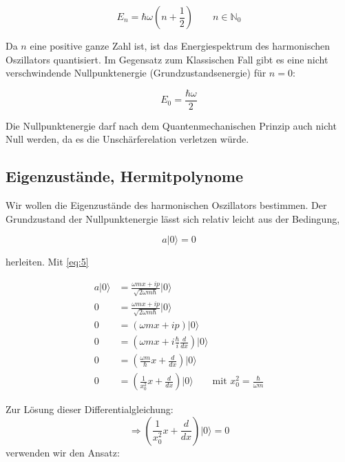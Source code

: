 \begin{equation}
  \label{eq:30}
  \boxed{E_n = \hbar\omega\left(n + \frac{1}{2}\right) \qquad n \in \mathbb N_0}
\end{equation}

Da \(n\) eine positive ganze Zahl ist, ist das Energiespektrum des harmonischen Oszillators quantisiert. Im Gegensatz zum Klassischen Fall gibt es eine nicht verschwindende Nullpunktenergie (Grundzustandsenergie) für \(n=0\):

\begin{equation}
  \label{eq:31}
  E_0 = \frac{\hbar\omega }{2}
\end{equation}

Die Nullpunktenergie darf nach dem Quantenmechanischen Prinzip auch nicht Null werden, da es die Unschärferelation verletzen würde.


\subsection*{Eigenzustände, Hermitpolynome}

Wir wollen die Eigenzustände des harmonischen Oszillators bestimmen. Der Grundzustand der Nullpunktenergie lässt sich relativ leicht aus der Bedingung,

\begin{equation}
  \label{eq:32}
  a |0 \rangle  = 0
\end{equation}

herleiten. Mit \eqref{eq:5}

\begin{align}
  \label{eq:33}
  a|0\rangle  &= \frac{\omega m x+ip}{\sqrt{2\omega m\hbar}}|0\rangle  \\
 0 &= \frac{\omega m x+ip}{\sqrt{2\omega m\hbar}}|0\rangle  \\
 0 &= \left(\omega m x+ip\right)|0\rangle  \\
 0 &= \left(\omega m x+i \frac{\hbar}{i} \frac{d}{dx}\right)|0\rangle  \\
 0 &= \left( \frac{\omega m}{\hbar} x+ \frac{d}{dx}\right)|0\rangle  \\
 0 &= \left( \frac{1}{x^2_0} x+ \frac{d}{dx}\right)|0\rangle \qquad \text{mit } x_0^2 = \frac{\hbar}{\omega m} 
\end{align}

Zur Lösung dieser Differentialgleichung:
\begin{equation}
  \label{eq:34}
 \Rightarrow  \left( \frac{1}{x^2_0} x+ \frac{d}{dx}\right)|0\rangle = 0
\end{equation}
verwenden wir den Ansatz:

